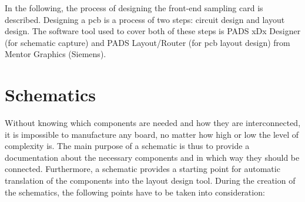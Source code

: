 In the following, the process of designing the front-end sampling card is described. Designing a \gls{pcb} is a process of two steps: circuit design and layout design. The software tool used to cover both of these steps is PADS xDx Designer (for schematic capture) and PADS Layout/Router (for \gls{pcb} layout design) from Mentor Graphics (Siemens). 
\section{Schematics}
Without knowing which components are needed and how they are interconnected, it is impossible to manufacture any board, no matter how high or low the level of complexity is. The main purpose of a schematic is thus to provide a documentation about the necessary components and in which way they should be connected. Furthermore, a schematic provides a starting point for automatic translation of the components into the layout design tool.
During the creation of the schematics, the following points have to be taken into consideration:
